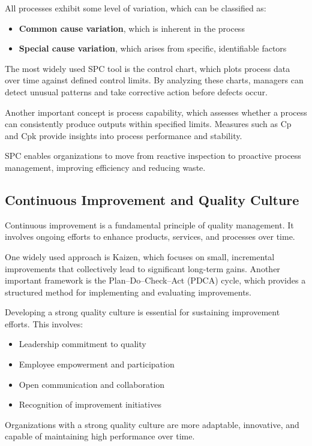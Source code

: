 \documentclass[12pt,a4paper]{article}
\begin{document}
All processes exhibit some level of variation, which can be classified as:
\begin{itemize}
    \item \textbf{Common cause variation}, which is inherent in the process
    \item \textbf{Special cause variation}, which arises from specific, identifiable factors
\end{itemize}

The most widely used SPC tool is the control chart, which plots process data over time against defined control limits. By analyzing these charts, managers can detect unusual patterns and take corrective action before defects occur.

Another important concept is process capability, which assesses whether a process can consistently produce outputs within specified limits. Measures such as Cp and Cpk provide insights into process performance and stability.

SPC enables organizations to move from reactive inspection to proactive process management, improving efficiency and reducing waste.

\subsection*{Continuous Improvement and Quality Culture}
Continuous improvement is a fundamental principle of quality management. It involves ongoing efforts to enhance products, services, and processes over time.

One widely used approach is Kaizen, which focuses on small, incremental improvements that collectively lead to significant long-term gains. Another important framework is the Plan–Do–Check–Act (PDCA) cycle, which provides a structured method for implementing and evaluating improvements.

Developing a strong quality culture is essential for sustaining improvement efforts. This involves:
\begin{itemize}
    \item Leadership commitment to quality
    \item Employee empowerment and participation
    \item Open communication and collaboration
    \item Recognition of improvement initiatives
\end{itemize}

Organizations with a strong quality culture are more adaptable, innovative, and capable of maintaining high performance over time.
\end{document}
